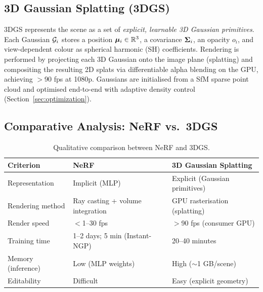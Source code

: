 \subsection{3D Gaussian Splatting (3DGS)}
\label{ssec:3dgs}

3DGS represents the scene as a set of \emph{explicit, learnable 3D Gaussian
primitives}. Each Gaussian $\mathcal{G}_i$ stores a position $\boldsymbol{\mu}_i \in \mathbb{R}^3$, a
covariance $\boldsymbol{\Sigma}_i$, an opacity $o_i$, and view-dependent colour as spherical
harmonic (SH) coefficients. Rendering is performed by projecting each 3D
Gaussian onto the image plane (splatting) and compositing the resulting 2D
splats via differentiable alpha blending on the GPU, achieving $>$90 fps at
1080p. Gaussians are initialised from a SfM sparse point cloud and optimised
end-to-end with adaptive density control (Section~\ref{sec:optimization}).

\subsection{Comparative Analysis: NeRF vs.\ 3DGS}
\label{ssec:comparison}

\begin{table}[H]
  \centering
  \caption{Qualitative comparison between NeRF and 3DGS.}
  \label{tab:comparison}
  \renewcommand{\arraystretch}{1.4}
  \begin{tabular}{l p{5.2cm} p{5.2cm}}
    \toprule
    \textbf{Criterion} & \textbf{NeRF} & \textbf{3D Gaussian Splatting} \\
    \midrule
    Representation     & Implicit (MLP) & Explicit (Gaussian primitives) \\
    Rendering method   & Ray casting + volume integration & GPU rasterisation (splatting) \\
    Render speed       & $<$1--30 fps & $>$90 fps (consumer GPU) \\
    Training time      & 1--2 days; 5 min (Instant-NGP) & 20--40 minutes \\
    Memory (inference) & Low (MLP weights) & High ($\sim$1 GB/scene) \\
    Editability        & Difficult & Easy (explicit geometry) \\
    \bottomrule
  \end{tabular}
\end{table}

